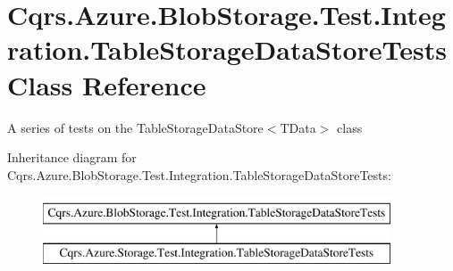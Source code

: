\hypertarget{classCqrs_1_1Azure_1_1BlobStorage_1_1Test_1_1Integration_1_1TableStorageDataStoreTests}{}\section{Cqrs.\+Azure.\+Blob\+Storage.\+Test.\+Integration.\+Table\+Storage\+Data\+Store\+Tests Class Reference}
\label{classCqrs_1_1Azure_1_1BlobStorage_1_1Test_1_1Integration_1_1TableStorageDataStoreTests}


A series of tests on the Table\+Storage\+Data\+Store$<$\+T\+Data$>$ class  


Inheritance diagram for Cqrs.\+Azure.\+Blob\+Storage.\+Test.\+Integration.\+Table\+Storage\+Data\+Store\+Tests\+:\begin{figure}[H]
\begin{center}
\leavevmode
\includegraphics[height=2.000000cm]{classCqrs_1_1Azure_1_1BlobStorage_1_1Test_1_1Integration_1_1TableStorageDataStoreTests}
\end{center}
\end{figure}
